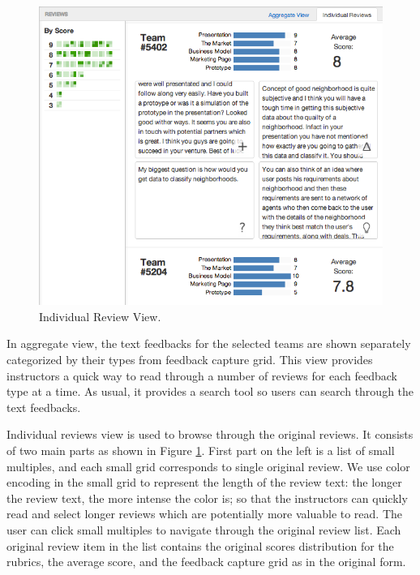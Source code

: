 \documentclass{sigchi}
\begin{document}
\begin{figure}[]
\centering
\includegraphics[width=1.4\columnwidth]{images/ind-review-view}
\caption{Individual Review View.}
\label{fig:ind-view}
\end{figure}


In aggregate view, the text feedbacks for the selected teams are shown
separately categorized by their types from feedback capture grid. This view
provides instructors a quick way to read through a number of reviews for each
feedback type at a time. As usual, it provides a search tool so users can
search through the text feedbacks.

Individual reviews view is used to browse through the original reviews. It
consists of two main parts as shown in Figure \ref{fig:ind-view}. First part
on the left is a list of small multiples, and each small grid corresponds to
single original review. We use color encoding in the small grid to represent
the length of the review text: the longer the review text, the more intense
the color is; so that the instructors can quickly read and select longer
reviews which are potentially more valuable to read. The user can click small
multiples to navigate through the original review list. Each original review
item in the list contains the original scores distribution for the rubrics,
the average score, and the feedback capture grid as in the original form.
\end{document}
